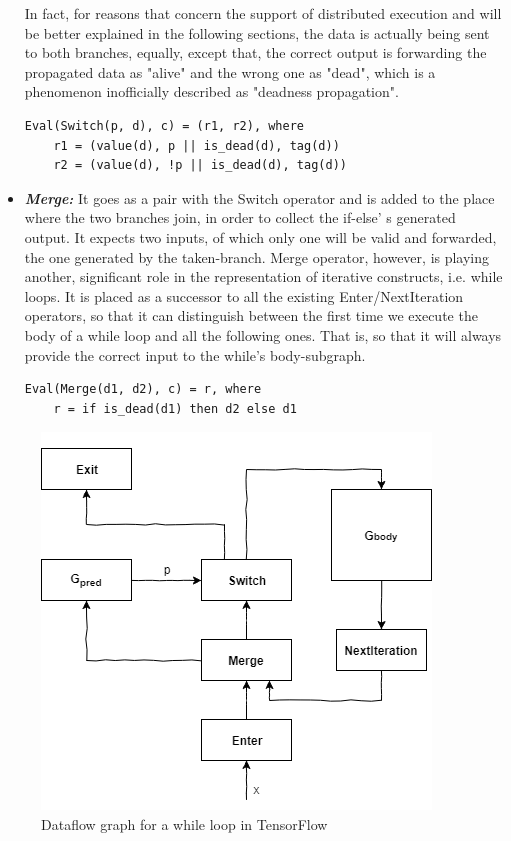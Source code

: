 \documentclass[ack,preface]{dithesis}
\begin{document}
\begin{itemize}
In fact, for reasons that concern the support of distributed execution and will be better explained in the following sections,  the data is actually being sent to both branches, equally, 
except that, the correct output is forwarding the propagated data as "alive" and the wrong one as "dead", which is a phenomenon inofficially described as "deadness propagation".
\begin{lstlisting}
Eval(Switch(p, d), c) = (r1, r2), where
	r1 = (value(d), p || is_dead(d), tag(d))
	r2 = (value(d), !p || is_dead(d), tag(d))
\end{lstlisting}


    \item \textit{\textbf{Merge:}} It goes as a pair with the Switch operator and is added to the place where the two branches join, in order to collect the if-else' s generated output. It expects two inputs, of which only one will be valid and forwarded, the one generated by the taken-branch. Merge operator, however, is playing another, significant role in the representation of iterative constructs, i.e. while loops. It is placed as a successor to all the existing Enter/NextIteration operators, so that it can distinguish between the first time we execute the body of a while loop and all the following ones. That is, so that  it will always provide the correct input to the while's body-subgraph. 
\begin{lstlisting}
Eval(Merge(d1, d2), c) = r, where
	r = if is_dead(d1) then d2 else d1
\end{lstlisting}

    \end{itemize}

\begin{figure}
\centering
\includegraphics[scale=0.85]{figures/while}
\caption{ Dataflow graph for a while loop in TensorFlow}
\end{figure}
\end{document}
